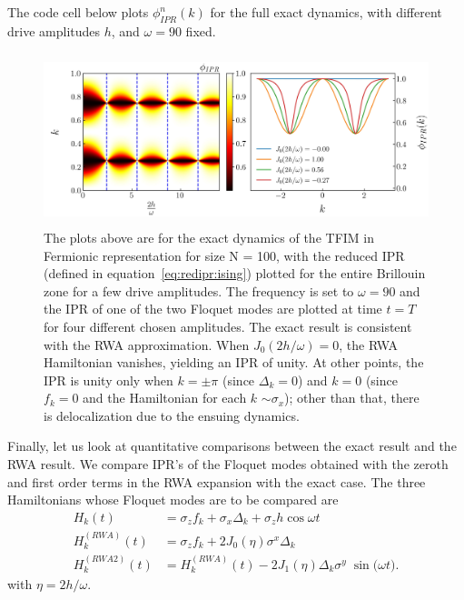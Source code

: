 \documentclass{article}
\begin{document}
The code cell below plots $\phi^n_{IPR}(k)$ for the full exact dynamics, with different drive amplitudes $h$, and $\omega = 90$ fixed.


\begin{figure}[]
\centering
\includegraphics[height = 5cm, width = 12cm]{ising_exact_ipr.jpeg}
\caption{The plots above are for the exact dynamics of the TFIM in Fermionic representation for size N = 100, with the reduced IPR (defined in equation~\ref{eq:redipr:ising}) plotted for the entire Brillouin zone for a few drive amplitudes. The frequency is set to $\omega = 90$ and the IPR of one of the two Floquet modes are plotted at time $t=T$ for four different chosen amplitudes. The exact result is consistent with the RWA approximation. When $J_0(2h/\omega) = 0$, the RWA Hamiltonian vanishes, yielding an IPR of unity. At other points, the IPR is unity only when $k=\pm \pi$ (since $\Delta_k=0$) and $k=0$ (since $f_k = 0$ and the Hamiltonian for each $k$ $\sim \sigma_x$); other than that, there is delocalization due to the ensuing dynamics.}
\end{figure}

Finally, let us look at quantitative comparisons between the exact result and the RWA result.  We compare IPR's of the Floquet modes obtained with the zeroth and first order terms in the RWA expansion with the exact case. The three Hamiltonians whose Floquet modes are to be compared are
\begin{align*}
H_k(t) &= \sigma_z f_k + \sigma_x \Delta_k + \sigma_z h\cos{\omega t}\\
H^{(RWA)}_k(t) &= \sigma_z f_k + 2 J_0(\eta) \sigma^x \Delta_k\\
H^{(RWA2)}_k(t) &= H^{(RWA)}_k(t) - 2 J_1(\eta)\Delta_k \sigma^y\;\sin{\big(\omega t\big)}. 
\end{align*}
with $\eta=2 h/\omega$. 
\end{document}
